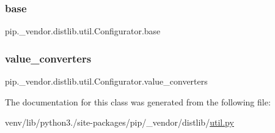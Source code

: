 \subsubsection{\texorpdfstring{base}{base}}
{\footnotesize\ttfamily pip.\+\_\+vendor.\+distlib.\+util.\+Configurator.\+base}

\mbox{\label{classpip_1_1__vendor_1_1distlib_1_1util_1_1Configurator_a635216cef15c01071b1dd01750aec194}} 
\subsubsection{\texorpdfstring{value\+\_\+converters}{value\_converters}}
{\footnotesize\ttfamily pip.\+\_\+vendor.\+distlib.\+util.\+Configurator.\+value\+\_\+converters\hspace{0.3cm}{\ttfamily [static]}}



The documentation for this class was generated from the following file\+:\begin{DoxyCompactItemize}
\item 
venv/lib/python3./site-\/packages/pip/\+\_\+vendor/distlib/\hyperlink{pip_2__vendor_2distlib_2util_8py}{util.\+py}\end{DoxyCompactItemize}

